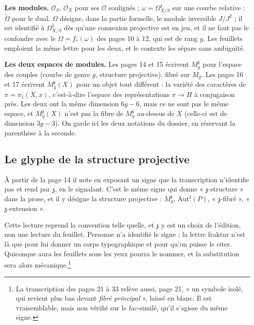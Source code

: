 \documentclass[11pt,a4paper]{article}
\begin{document}
\textbf{Les modules.} $\mathcal{O}_S$, $\mathcal{O}_X$ pour ses $\mathcal{O}$
soulignés ; $\omega = \Omega^1_{X/S}$ sur une courbe relative ;
$\check{\Omega}$ pour le dual. $\Omega$ désigne, dans la partie formelle, le
module inversible $J/J^2$ ; il est identifié à $\Omega^1_{X/S}$ dès qu'une
connexion projective est en jeu, et il ne faut pas le confondre avec le
$\Omega = f_*(\omega)$ des pages 10 à 12, qui est de rang $g$. Les feuillets
emploient la même lettre pour les deux, et le contexte les sépare sans
ambiguïté.

\textbf{Les deux espaces de modules.} Les pages 14 et 15 écrivent
$M_g^{\mathfrak{z}}$ pour l'espace des couples (courbe de genre $g$, structure
projective), fibré sur $M_g$. Les pages 16 et 17 écrivent
$M_g^{\mathfrak{z}}(X)$ pour un objet tout différent : la variété des
caractères de $\pi = \pi_1(X,x)$, c'est-à-dire l'espace des représentations
$\pi \to H$ à conjugaison près. Les deux ont la même dimension $6g-6$, mais
ce ne sont pas le même espace, et
$M_g^{\mathfrak{z}}(X)$ n'est pas la fibre de $M_g^{\mathfrak{z}}$ au-dessus
de $X$ (celle-ci est de dimension $3g-3$). On garde ici les deux notations du
dossier, en réservant la parenthèse à la seconde.

\subsection*{Le glyphe de la structure projective}

À partir de la page 14 il note en exposant un signe que la transcription
n'identifie pas et rend par $\mathfrak{z}$, en le signalant. C'est le même signe qui donne « $\mathfrak{z}$-structure » dans la
prose, et il y désigne la structure projective : $M_g^{\mathfrak{z}}$,
$\mathrm{Aut}^{\mathfrak{z}}(P)$, « $\mathfrak{z}$-fibré »,
« $\mathfrak{z}$-extension ».

Cette lecture reprend la convention telle quelle, et $\mathfrak{z}$ y est un
choix de l'édition, non une lecture du feuillet. Personne n'a identifié le signe ; la lettre fraktur
n'est là que pour lui donner un corps typographique et pour qu'on puisse le
citer. Quiconque aura les feuillets sous les yeux pourra le nommer, et la
substitution sera alors mécanique.\footnote{La transcription des pages 21 à 33
relève aussi, page 21, « un symbole isolé, qui revient plus bas devant
\emph{fibré principal} », laissé en blanc. Il est vraisemblable, mais non
vérifié sur le fac-similé, qu'il s'agisse du même signe.}

\end{document}
